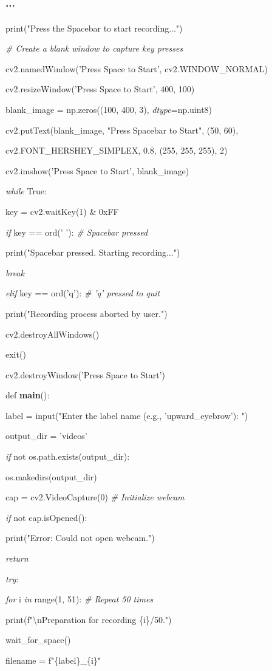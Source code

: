 \documentclass[
]{article}
\begin{document}
"""

print("Press the Spacebar to start recording...")

\emph{\# Create a blank window to capture key presses}

cv2.namedWindow('Press Space to Start', cv2.WINDOW\_NORMAL)

cv2.resizeWindow('Press Space to Start', 400, 100)

blank\_image = np.zeros((100, 400, 3), \emph{dtype}=np.uint8)

cv2.putText(blank\_image, "Press Spacebar to Start", (50, 60),

cv2.FONT\_HERSHEY\_SIMPLEX, 0.8, (255, 255, 255), 2)

cv2.imshow('Press Space to Start', blank\_image)

\emph{while} True:

key = cv2.waitKey(1) \& 0xFF

\emph{if} key == ord(' '): \emph{\# Spacebar pressed}

print("Spacebar pressed. Starting recording...")

\emph{break}

\emph{elif} key == ord('q'): \emph{\# 'q' pressed to quit}

print("Recording process aborted by user.")

cv2.destroyAllWindows()

exit()

cv2.destroyWindow('Press Space to Start')

def \textbf{main}():

label = input("Enter the label name (e.g., 'upward\_eyebrow'): ")

output\_dir = 'videos'

\emph{if} not os.path.exists(output\_dir):

os.makedirs(output\_dir)

cap = cv2.VideoCapture(0) \emph{\# Initialize webcam}

\emph{if} not cap.isOpened():

print("Error: Could not open webcam.")

\emph{return}

\emph{try}:

\emph{for} i \emph{in} range(1, 51): \emph{\# Repeat 50 times}

print(f"\textbackslash nPreparation for recording \{i\}/50.")

wait\_for\_space()

filename = f"\{label\}\_\{i\}"
\end{document}
